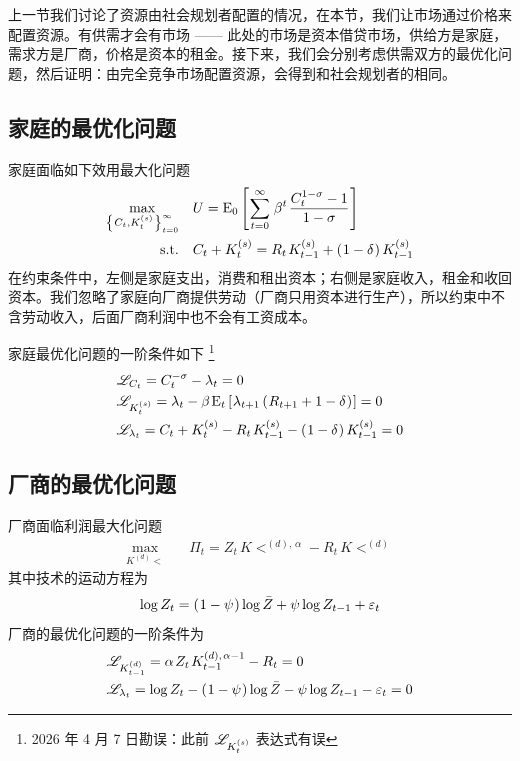 上一节我们讨论了资源由社会规划者配置的情况，在本节，我们让市场通过价格来配置资源。有供需才会有市场 —— 此处的市场是资本借贷市场，供给方是家庭，需求方是厂商，价格是资本的租金。接下来，我们会分别考虑供需双方的最优化问题，然后证明：由完全竞争市场配置资源，会得到和社会规划者的相同。

\subsection{家庭的最优化问题}\label{subsec:HHProb}

家庭面临如下效用最大化问题
\begin{align*}
    \max_{\bkd{C_t,K^{(s)}_t}\wsito} \quad & U= \mean_0\bks{\sum\wsito \,\beta^t\,\dfrac{C_t^{1-\sigma}-1}{1-\sigma}} \\
    \text{s.t.} \quad & C_t+K_t^{(s)}=R\s t\,K\lt\w{(s)}+\bka{1-\delta}K\lt\w{(s)}
\end{align*}
在约束条件中，左侧是家庭支出，消费和租出资本；右侧是家庭收入，租金和收回资本。我们忽略了家庭向厂商提供劳动（厂商只用资本进行生产），所以约束中不含劳动收入，后面厂商利润中也不会有工资成本。

家庭最优化问题的一阶条件如下 \footnote{2026 年 4 月 7 日勘误：此前 \(\scr L_{K_t^{(s)}}\) 表达式有误}
\begin{align*}
    &\scr L_{C_t}=C^{-\sigma}_t-\lambda_t=0\\
    &\scr L_{K_t^{(s)}}=\lambda_t-\beta\,\mean_t\bks{\lambda\nt\bka{R\nt+1-\delta}}=0\\
    &\scr L_{\lambda_t}=C_t+K_t^{(s)}-R\s t\,K\lt\w{(s)}-\bka{1-\delta}K\lt\w{(s)}=0
\end{align*}


\subsection{厂商的最优化问题}\label{subsec:ProduceProb}

厂商面临利润最大化问题
\begin{align*}
    \max_{K^{(d)}\lt} \quad & \Pi_t=Z_t\,K\lt^{(d),\,\alpha}-R_t\, K\lt^{(d)}
\end{align*}
其中技术的运动方程为
\begin{align*}
    \operatorname{log} Z_t=\left(\mspace{1mu}1-\psi\mspace{1mu}\right)\operatorname{log}\bar Z+\psi\operatorname{log} Z_{t-1}+\varepsilon_t
\end{align*}
厂商的最优化问题的一阶条件为
\begin{align*}
    &\scr L_{K\lt^{(d)}}=\alpha\, Z_t\,K\lt^{(d),\,\alpha-1}-R_t=0\\
    &\scr L_{\lambda_t}=\log Z_t-\bka{1-\psi}\log\bar Z-\psi\log Z\lt-\varepsilon_t=0
\end{align*}

